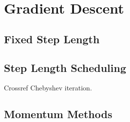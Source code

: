 \chapter{Gradient Descent}
\label{Ch: 10-Gra-Des}
\section{Fixed Step Length}
\section{Step Length Scheduling}
Crossref Chebyshev iteration.
\section{Momentum Methods}
